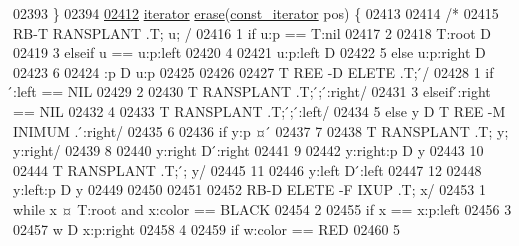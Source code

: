 \begin{DoxyCode}
02393             \}
02394 
\hypertarget{map2_8h_source_l02412}{}\hyperlink{classaed2_1_1iterator_adf371aaec9e68bd4a4d5a889d0b6b679_adf371aaec9e68bd4a4d5a889d0b6b679}{02412}             \hyperlink{classaed2_1_1iterator_1_1iterator}{iterator} \hyperlink{classaed2_1_1iterator_adf371aaec9e68bd4a4d5a889d0b6b679_adf371aaec9e68bd4a4d5a889d0b6b679}{erase}(\hyperlink{classaed2_1_1iterator_1_1const__iterator}{const_iterator} pos) \{
02413 
02414                 \textcolor{comment}{/*}
02415 \textcolor{comment}{                RB-T RANSPLANT .T; u; /}
02416 \textcolor{comment}{        1 if u:p == T:nil}
02417 \textcolor{comment}{        2}
02418 \textcolor{comment}{        T:root D}
02419 \textcolor{comment}{        3 elseif u == u:p:left}
02420 \textcolor{comment}{        4}
02421 \textcolor{comment}{        u:p:left D}
02422 \textcolor{comment}{        5 else u:p:right D}
02423 \textcolor{comment}{        6}
02424 \textcolor{comment}{        :p D u:p}
02425 \textcolor{comment}{}
02426 \textcolor{comment}{}
02427 \textcolor{comment}{        T REE -D ELETE .T;  ́/}
02428 \textcolor{comment}{        1 if  ́:left == NIL}
02429 \textcolor{comment}{        2}
02430 \textcolor{comment}{        T RANSPLANT .T;  ́;  ́:right/}
02431 \textcolor{comment}{        3 elseif  ́:right == NIL}
02432 \textcolor{comment}{        4}
02433 \textcolor{comment}{        T RANSPLANT .T;  ́;  ́:left/}
02434 \textcolor{comment}{        5 else y D T REE -M INIMUM . ́:right/}
02435 \textcolor{comment}{        6}
02436 \textcolor{comment}{        if y:p ¤  ́}
02437 \textcolor{comment}{        7}
02438 \textcolor{comment}{        T RANSPLANT .T; y; y:right/}
02439 \textcolor{comment}{        8}
02440 \textcolor{comment}{        y:right D  ́:right}
02441 \textcolor{comment}{        9}
02442 \textcolor{comment}{        y:right:p D y}
02443 \textcolor{comment}{        10}
02444 \textcolor{comment}{        T RANSPLANT .T;  ́; y/}
02445 \textcolor{comment}{        11}
02446 \textcolor{comment}{        y:left D  ́:left}
02447 \textcolor{comment}{        12}
02448 \textcolor{comment}{        y:left:p D y}
02449 \textcolor{comment}{}
02450 \textcolor{comment}{}
02451 \textcolor{comment}{}
02452 \textcolor{comment}{        RB-D ELETE -F IXUP .T; x/}
02453 \textcolor{comment}{        1 while x ¤ T:root and x:color == BLACK}
02454 \textcolor{comment}{        2}
02455 \textcolor{comment}{        if x == x:p:left}
02456 \textcolor{comment}{        3}
02457 \textcolor{comment}{        w D x:p:right}
02458 \textcolor{comment}{        4}
02459 \textcolor{comment}{        if w:color == RED}
02460 \textcolor{comment}{        5}

\end{DoxyCode}
